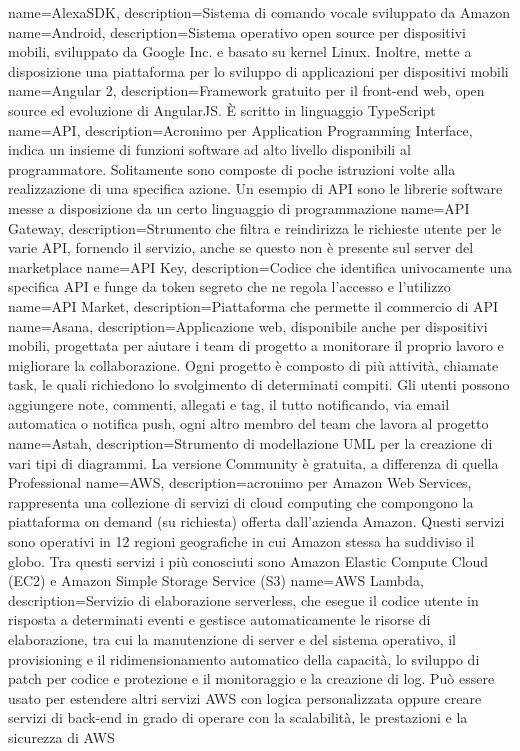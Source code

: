 \hypertarget{A}{}

{
	name=AlexaSDK,
	description={Sistema di comando vocale sviluppato da Amazon}
}
{
	name=Android,
	description={Sistema operativo open source per dispositivi mobili, sviluppato da Google Inc. e basato su kernel Linux. Inoltre, mette a disposizione una piattaforma per lo sviluppo di applicazioni per dispositivi mobili}
}
{
	name=Angular 2,
	description={Framework gratuito per il front-end web, open source ed evoluzione di AngularJS. \MakeUppercase{è} scritto in linguaggio TypeScript}
}
{
	name=API,
	description={Acronimo per Application Programming Interface, indica un insieme di funzioni software ad alto livello disponibili al programmatore. Solitamente sono composte di poche istruzioni volte alla realizzazione di una specifica azione. Un esempio di API sono le librerie software messe a disposizione da un certo linguaggio di programmazione}
}
{
	name=API Gateway,
	description={Strumento che filtra e reindirizza le richieste utente per le varie API, fornendo il servizio, anche se questo non è presente sul server del marketplace}
}
{
	name=API Key,
	description={Codice che identifica univocamente una specifica API e funge da token segreto che ne regola l'accesso e l'utilizzo}
}
{
	name=API Market,
	description={Piattaforma che permette il commercio di API}
}
{
	name=Asana,
	description={Applicazione web, disponibile anche per dispositivi mobili, progettata per aiutare i team di progetto a monitorare il proprio lavoro e migliorare la collaborazione. Ogni progetto è composto di più attività, chiamate task, le quali richiedono lo svolgimento di determinati compiti. Gli utenti possono aggiungere note, commenti, allegati e tag, il tutto notificando, via email automatica o notifica push, ogni altro membro del team che lavora al progetto}
}
{
	name=Astah,
	description={Strumento di modellazione UML per la creazione di vari tipi di diagrammi. La versione Community è gratuita, a differenza di quella Professional}
}
{
	name=AWS,
	description={acronimo per Amazon Web Services, rappresenta una collezione di servizi di cloud computing che compongono la piattaforma on demand (su richiesta) offerta dall'azienda Amazon. Questi servizi sono operativi in 12 regioni geografiche in cui Amazon stessa ha suddiviso il globo. Tra questi servizi i più conosciuti sono Amazon Elastic Compute Cloud (EC2) e Amazon Simple Storage Service (S3)}
}
{
	name=AWS Lambda,
	description={Servizio di elaborazione serverless, che esegue il codice utente in risposta a determinati eventi e gestisce automaticamente le risorse di elaborazione, tra cui la manutenzione di server e del sistema operativo, il provisioning e il ridimensionamento automatico della capacità, lo sviluppo di patch per codice e protezione e il monitoraggio e la creazione di log. Può essere usato per estendere altri servizi AWS con logica personalizzata oppure creare servizi di back-end in grado di operare con la scalabilità, le prestazioni e la sicurezza di AWS}
}

